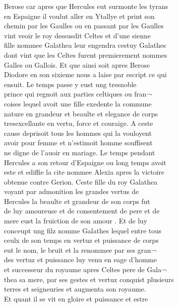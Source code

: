 \documentclass[12pt]{article}
\begin{document}
\newpage
Berose
          car apres que Hercules eut surmonte les
            tyrans\\
en Espaigne il voulut aller en Ytallye et print son\\
chemin
          par les Gaulles ou en passant par les Gaulles\\
vint veoir le roy dessusdit
            Celtes et d'une sienne\\
fille nommee
            Galathea leur engendra cestuy Galathes\\
dont vint que les Celtes furent
          premierement nommes\\
Galles ou Gallois. Et que ainsi soit apres Berose\\
Diodore en son sixieme
          nous a laise par escript ce qui\\
ensuit. Le temps passe y eust ung tresnoble\\
prince qui regnoit aux parties celtiques ou fran¬\\
coises lequel avoit
          une fille exedente la commune\\
nature en grandeur et beaulte et elegance de
            corps\\
tresexcellante en vertu, force et couraige. A ceste\\
cause
          deprisoit tous les hommes qui la vouloyent\\
avoir pour femme et n'estimoit homme
            souffisent\\
ne digne de l'auoir en mariage. Le temps pendant\\
Hercules a son retour d'Espaigne ou long
          temps avoit\\
este et ediffie la cite nommee Alexia apres la victoire\\
obtenue contre Gerion. Ceste fille du roy
            Galathea\\
voyant par admonition les
          grandes vertus de\\
Hercules la
          beaulte et grandeur de son corps fut\\
de luy amoureuse et de consentement de
          pere et de\\
mere eust la fruiction de son amour . Et de luy\\
conceupt
          ung filz nomme Galathes lequel entre tous\\
ceulx de son temps en vertuz et puissance de corps\\
eut le nom, le bruit et la
          renommee par ses gran¬\\
des vertuz et puissance luy venu en eage d'homme\\
et successeur du royaume apres Celtes pere de
            Gala¬\\
thea sa mere, par ses gestes et
          vertuz conquist plusieurs\\
terres et seigneuries et augmenta son royaume.\\
Et quant il se vit en gloire et puissance et estre
\end{document}
